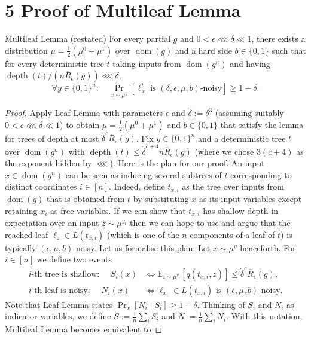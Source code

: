 \section*{5 Proof of Multileaf Lemma}
\begin{authorclaim}{Multileaf Lemma (restated)}
For every partial $g$ and $0<\epsilon\lll\delta\ll1$, there exists a distribution $\mu=\frac12(\mu^0+\mu^1)$ over $\operatorname{dom}(g)$ and a hard side $b\in\{0,1\}$ such that for every deterministic tree $t$ taking inputs from $\operatorname{dom}(g^n)$ and having $\operatorname{depth}(t)/(n\overline R_\epsilon(g))\lll\delta$,
\[\forall y\in\{0,1\}^n:\quad\Pr_{x\sim\mu^y}[\ell_x^t\text{ is }(\delta,\epsilon,\mu,b)\text{-noisy}]\ge1-\delta.\]
\end{authorclaim}
\begin{proof}
Apply Leaf Lemma with parameters $\epsilon$ and $\dot\delta:=\delta^3$ (assuming suitably $0<\epsilon\lll\dot\delta\ll1$) to obtain $\mu=\frac12(\mu^0+\mu^1)$ and $b\in\{0,1\}$ that satisfy the lemma for trees of depth at most $\dot\delta^c\overline R_\epsilon(g)$. Fix $y\in\{0,1\}^n$ and a deterministic tree $t$ over $\operatorname{dom}(g^n)$ with $\operatorname{depth}(t)\le\dot\delta^{c+4}n\overline R_\epsilon(g)$ (where we chose $3(c+4)$ as the exponent hidden by $\lll$).
Here is the plan for our proof. An input $x\in\operatorname{dom}(g^n)$ can be seen as inducing several subtrees of $t$ corresponding to distinct coordinates $i\in[n]$. Indeed, define $t_{x,i}$ as the tree over inputs from $\operatorname{dom}(g)$ that is obtained from $t$ by substituting $x$ as its input variables except retaining $x_i$ as free variables. If we can show that $t_{x,i}$ has shallow depth in expectation over an input $z\sim\mu^{y_i}$ then we can hope to use and argue that the reached leaf $\ell_z\in L(t_{x,i})$ (which is one of the $n$ components of a leaf of $t$) is typically $(\epsilon,\mu,b)$-noisy.
Let us formalise this plan. Let $x\sim\mu^y$ henceforth. For $i\in[n]$ we define two events
\begin{align*}
\text{$i$-th tree is shallow: }\quad S_i(x)&\Longleftrightarrow\mathbb E_{z\sim\mu^{y_i}}[q(t_{x,i},z)]\le\dot\delta^c\overline R_\epsilon(g),\\
\text{$i$-th leaf is noisy: }\quad N_i(x)&\Longleftrightarrow\ell_{x_i}\in L(t_{x,i})\text{ is }(\epsilon,\mu,b)\text{-noisy}.
\end{align*}
Note that Leaf Lemma states $\Pr_x[N_i\mid S_i]\ge1-\dot\delta$. Thinking of $S_i$ and $N_i$ as indicator variables, we define $S:=\frac1n\sum_iS_i$ and $N:=\frac1n\sum_iN_i$. With this notation, Multileaf Lemma becomes equivalent to

\end{proof}
